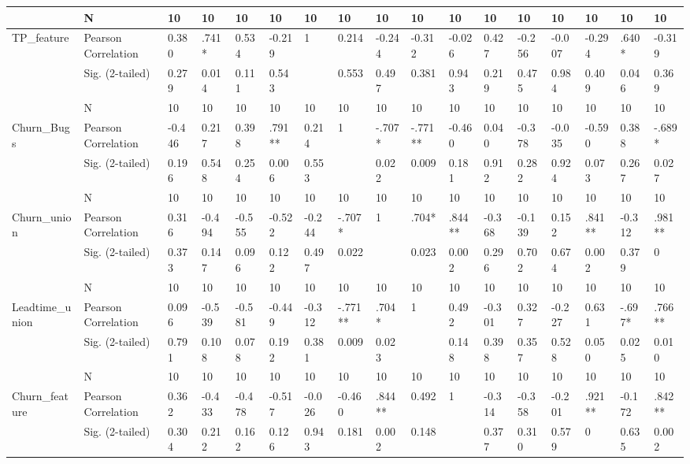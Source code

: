 \documentclass[UKenglish]{ifimaster}  %
\begin{document}
\begin{table}[!htbp]
\begin{adjustwidth}{-2.5cm}{}
{\begin{tabular}{ | l | l | l | l | l | l | l | l | l | l | l | l | l | l | l | l | l | }
	 & N & 10 & 10 & 10 & 10 & 10 & 10 & 10 & 10 & 10 & 10 & 10 & 10 & 10 & 10 & 10 \\ \hline
	TP\_feature & Pearson Correlation & 0.380 & .741* & 0.534 & -0.219 & 1 & 0.214 & -0.244 & -0.312 & -0.026 & 0.427 & -0.256 & -0.007 & -0.294 & .640* & -0.319\\ \hline
	 & Sig. (2-tailed) & 0.279 & 0.014 & 0.111 & 0.543 &  & 0.553 & 0.497 & 0.381 & 0.943 & 0.219 & 0.475 & 0.984 & 0.409 & 0.046 & 0.369\\ \hline
	 & N & 10 & 10 & 10 & 10 & 10 & 10 & 10 & 10 & 10 & 10 & 10 & 10 & 10 & 10 & 10 \\ \hline
	Churn\_Bugs & Pearson Correlation & -0.446 & 0.217 & 0.398 & .791** & 0.214 & 1 & -.707* & -.771** & -0.460 & 0.040 & -0.378 & -0.035 & -0.590 & 0.388 & -.689* \\ \hline
	 & Sig. (2-tailed) & 0.196 & 0.548 & 0.254 & 0.006 & 0.553 &  & 0.022 & 0.009 & 0.181 & 0.912 & 0.282 & 0.924 & 0.073 & 0.267 & 0.027\\ \hline
	 & N & 10 & 10 & 10 & 10 & 10 & 10 & 10 & 10 & 10 & 10 & 10 & 10 & 10 & 10 & 10 \\ \hline
	Churn\_union & Pearson Correlation & 0.316 & -0.494 & -0.555 & -0.522 & -0.244 & -.707* & 1 & .704* & .844** & -0.368 & -0.139 & 0.152 & .841** & -0.312 & .981** \\ \hline
	 & Sig. (2-tailed) & 0.373 & 0.147 & 0.096 & 0.122 & 0.497 & 0.022 &  & 0.023 & 0.002 & 0.296 & 0.702 & 0.674 & 0.002 & 0.379 & 0\\ \hline
	 & N & 10 & 10 & 10 & 10 & 10 & 10 & 10 & 10 & 10 & 10 & 10 & 10 & 10 & 10 & 10 \\ \hline
	Leadtime\_union & Pearson Correlation & 0.096 & -0.539 & -0.581 & -0.449 & -0.312 & -.771** & .704* & 1 & 0.492 & -0.301 & 0.327 & -0.227 & 0.631 & -.697* & .766** \\ \hline
	 & Sig. (2-tailed) & 0.791 & 0.108 & 0.078 & 0.192 & 0.381 & 0.009 & 0.023 &  & 0.148 & 0.398 & 0.357 & 0.528 & 0.050 & 0.025 & 0.010\\ \hline
	 & N & 10 & 10 & 10 & 10 & 10 & 10 & 10 & 10 & 10 & 10 & 10 & 10 & 10 & 10 & 10 \\ \hline
	Churn\_feature & Pearson Correlation & 0.362 & -0.433 & -0.478 & -0.517 & -0.026 & -0.460 & .844** & 0.492 & 1 & -0.314 & -0.358 & -0.201 & .921** & -0.172 & .842** \\ \hline
	 & Sig. (2-tailed) & 0.304 & 0.212 & 0.162 & 0.126 & 0.943 & 0.181 & 0.002 & 0.148 &  & 0.377 & 0.310 & 0.579 & 0 & 0.635 & 0.002\\ \hline

\end{tabular}}
\end{adjustwidth}
\end{table}
\end{document}
